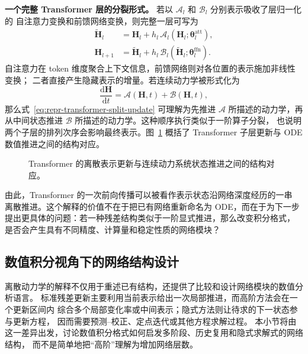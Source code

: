 \textbf{一个完整 Transformer 层的分裂形式。}
若以 \(\mathcal{A}_l\) 和 \(\mathcal{B}_l\) 分别表示吸收了层归一化的
自注意力变换和前馈网络变换，则完整一层可写为
\begin{align}
    \widetilde{\boldsymbol{H}}_l
    &=
    \boldsymbol{H}_l
    +
    h_l\,
    \mathcal{A}_l(
        \boldsymbol{H}_l;
        \boldsymbol{\theta}^{\mathrm{att}}_l
    ),
    \nonumber\\
    \boldsymbol{H}_{l+1}
    &=
    \widetilde{\boldsymbol{H}}_l
    +
    h_l\,
    \mathcal{B}_l(
        \widetilde{\boldsymbol{H}}_l;
        \boldsymbol{\theta}^{\mathrm{ffn}}_l
    ).
    \label{eq:repr-transformer-split-update}
\end{align}
自注意力在 token 维度聚合上下文信息，前馈网络则对各位置的表示施加非线性变换；
二者直接产生隐藏表示的增量。若连续动力学被形式化为
\[
    \frac{\mathrm{d}\boldsymbol{H}}{\mathrm{d}t}
    =
    \mathcal{A}(\boldsymbol{H},t)
    +
    \mathcal{B}(\boldsymbol{H},t),
\]
那么式~\eqref{eq:repr-transformer-split-update} 可理解为先推进
\(\mathcal{A}\) 所描述的动力学，再从中间状态推进
\(\mathcal{B}\) 所描述的动力学。这种顺序执行类似于一阶算子分裂，
也说明两个子层的排列次序会影响最终表示。图~\ref{fig:transformer-sublayer-as-ode-solver}
概括了 Transformer 子层更新与 ODE 数值推进之间的结构对应。

\begin{figure}[htbp]
    \centering
    \caption{Transformer 的离散表示更新与连续动力系统状态推进之间的结构对应。}
    \label{fig:transformer-sublayer-as-ode-solver}
\end{figure}

由此，Transformer 的一次前向传播可以被看作表示状态沿网络深度经历的一串
离散推进。这个解释的价值不在于把已有网络重新命名为 ODE，而在于为下一步
提出更具体的问题：若一种残差结构类似于一阶显式推进，那么改变积分格式，
是否会产生具有不同精度、计算量和稳定性质的网络模块？

\subsection{数值积分视角下的网络结构设计}

离散动力学的解释不仅用于重述已有结构，还提供了比较和设计网络模块的数值分析语言。
标准残差更新主要利用当前表示给出一次局部推进，而高阶方法会在一个更新区间内
综合多个局部变化率或中间表示；隐式方法则让待求的下一状态参与更新方程，
因而需要预测--校正、定点迭代或其他方程求解过程。
本小节将由这一差异出发，讨论数值积分格式如何启发多阶段、历史复用和隐式求解式的网络结构，
而不是简单地把“高阶”理解为增加网络层数。

